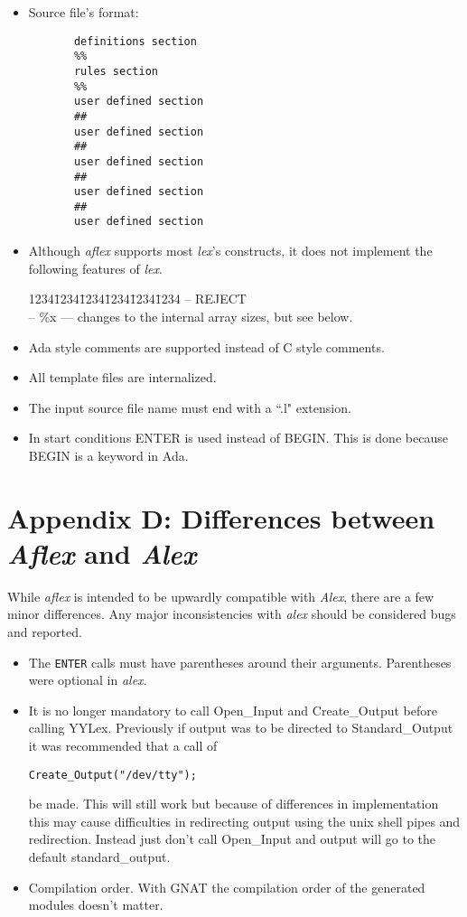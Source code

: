 \begin{itemize}
 \item Source file's format:
   \small
   \begin{verbatim}
       definitions section
       %% 
       rules section
       %% 
       user defined section
       ## 
       user defined section
       ##
       user defined section
       ##
       user defined section
       ##
       user defined section
   \end{verbatim}
   \normalsize


 \item Although {\sl aflex} supports most {\sl lex}'s constructs, it does not
	implement the following features of {\sl lex}.
\begin{tabbing}
1234\=1234\=1234\=1234\=1234\=1234 \kill
   \>-- REJECT \\
   \>-- \%x \>\>\>---  changes to the internal array sizes, but see below.
 \end{tabbing}
    
 \item  Ada style comments are supported instead of C style comments.

 \item  All template files are internalized.

 \item  The input source file name must end with a ``.l" extension.

 \item	In start conditions ENTER is used instead of BEGIN.  This is
	done because BEGIN is a keyword in Ada.
\end{itemize}

\section{Appendix D: Differences between {\sl Aflex} and {\sl Alex}}
\label{alexdiff}
While {\sl aflex} is intended to be upwardly compatible with {\sl
Alex}, there are a few minor differences.  Any major inconsistencies
with {\sl alex} should be considered bugs and reported.
\begin{itemize}
 \item  The {\tt ENTER} calls must have parentheses around their
arguments.  Parentheses were optional in {\sl alex.}

 \item  It is no longer mandatory to call Open\_Input and Create\_Output
before calling YYLex.  Previously if output was to be directed to
Standard\_Output it was recommended that a call of
\begin{verbatim}
Create_Output("/dev/tty");
\end{verbatim}
be made.  This will still work but because of differences in
implementation this may cause difficulties in redirecting output using
the {\sc unix} shell pipes and redirection.  Instead just don't call
Open\_Input and output will go to the default {\sc standard\_output.}

 \item	Compilation order.  With GNAT the compilation order of the
generated modules doesn't matter.
\end{itemize}

